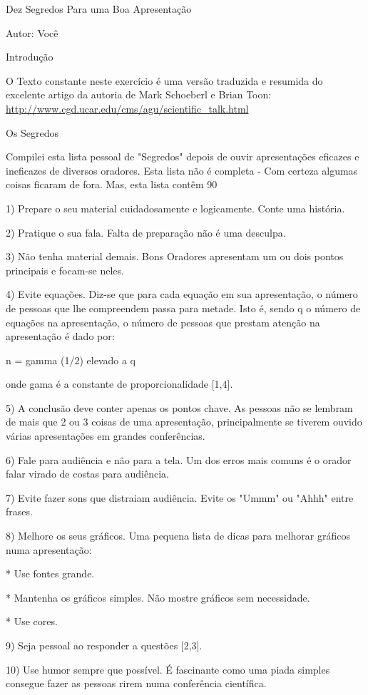 \documentclass[12pt]{article}
\begin{document}
Dez Segredos Para uma Boa Apresentação

Autor: Você

Introdução

O Texto constante neste exercício é uma versão traduzida e resumida do excelente artigo da autoria de Mark Schoeberl e Brian Toon:
\url{http://www.cgd.ucar.edu/cms/agu/scientific_talk.html}

Os Segredos

Compilei esta lista pessoal de "Segredos" depois de ouvir apresentações eficazes e ineficazes de diversos oradores. Esta lista não é completa - Com certeza algumas coisas ficaram de fora. Mas, esta lista contêm 90%

1) Prepare o seu material cuidadosamente e logicamente. Conte uma história.

2) Pratique o sua fala. Falta de preparação não é uma desculpa.

3) Não tenha  material demais. Bons Oradores apresentam um ou dois pontos principais e focam-se neles.

4) Evite equações. Diz-se que para cada equação em sua apresentação, o número de pessoas que lhe compreendem passa para metade. Isto é, sendo q o número de equações na apresentação, o número de pessoas que prestam atenção na apresentação é dado por:

n = gamma (1/2) elevado a q

onde gama é a constante de proporcionalidade [1,4].

5) A conclusão deve conter apenas os pontos chave. As pessoas não se lembram de mais que 2 ou 3 coisas de uma apresentação, principalmente se tiverem ouvido várias apresentações em grandes conferências.

6) Fale para audiência e não para a tela. Um dos erros mais comuns é o orador falar virado de costas para audiência. 

7) Evite fazer sons que distraiam audiência. Evite os "Ummm" ou "Ahhh" entre frases.

8) Melhore os seus gráficos. Uma pequena lista de dicas para melhorar gráficos numa apresentação:

* Use  fontes grande.

* Mantenha os gráficos simples. Não mostre gráficos sem necessidade.

* Use cores.

9) Seja pessoal ao responder a questões [2,3].

10) Use humor sempre que possível. É fascinante como uma piada simples consegue fazer as pessoas rirem numa conferência científica.
\end{document}
